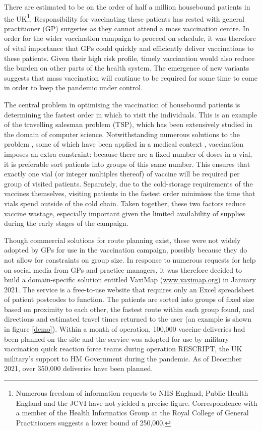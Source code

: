 \documentclass[review]{elsarticle}
\def\vm{VaxiMap}
\begin{document}
There are estimated to be on the order of half a million housebound patients in the UK\footnote{Numerous freedom of information requests to NHS England, Public Health England and the JCVI have not yielded a precise figure. Correspondence with a member of the Health Informatics Group at the Royal College of General Practitioners suggests a lower bound of 250,000.}. Responsibility for vaccinating these patients has rested with general practitioner (GP) surgeries as they cannot attend a mass vaccination centre. In order for the wider vaccination campaign to proceed on schedule, it was therefore of vital importance that GPs could quickly and efficiently deliver vaccinations to these patients. Given their high risk profile, timely vaccination would also reduce the burden on other parts of the health system. The emergence of new variants suggests that mass vaccination will continue to be required for some time to come in order to keep the pandemic under control. 

The central problem in optimising the vaccination of housebound patients is determining the fastest order in which to visit the individuals. This is an example of the travelling salesman problem (TSP), which has been extensively studied in the domain of computer science. Notwithstanding numerous solutions to the problem \cite{Laporte1990}, some of which have been applied in a medical context \cite{Shao2012}, vaccination imposes an extra constraint: because there are a fixed number of doses in a vial, it is preferable sort patients into groups of this same number. This ensures that exactly one vial (or integer multiples thereof) of vaccine will be required per group of visited patients. Separately, due to the cold-storage requirements of the vaccines themselves, visiting patients in the fastest order minimises the time that vials spend outside of the cold chain. Taken together, these two factors reduce vaccine wastage, especially important given the limited availability of supplies during the early stages of the campaign. 

Though commercial solutions for route planning exist, these were not widely adopted by GPs for use in the vaccination campaign, possibly because they do not allow for constraints on group size. In response to numerous requests for help on social media from GPs and practice managers, it was therefore decided to build a domain-specific solution entitled \vm{} (\hyperlink{https://www.vaximap.org}{www.vaximap.org}) in January 2021. The service is a free-to-use website that requires only an Excel spreadsheet of patient postcodes to function. The patients are sorted into groups of fixed size based on proximity to each other, the fastest route within each group found, and directions and estimated travel times returned to the user (an example is shown in figure \ref{demo}). Within a month of operation, 100,000 vaccine deliveries had been planned on the site and the service was adopted for use by military vaccination quick reaction force teams during operation RESCRIPT, the UK military's support to HM Government during the pandemic. As of December 2021, over 350,000 deliveries have been planned. 
\end{document}

